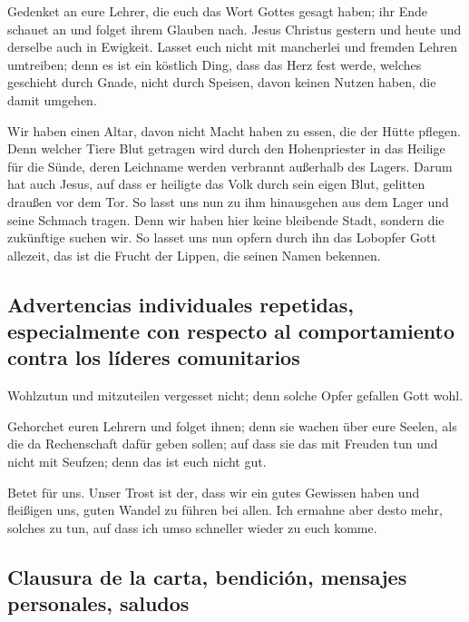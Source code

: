  Gedenket an eure Lehrer, die euch das Wort Gottes gesagt
haben; ihr Ende schauet an und folget ihrem Glauben nach. 
Jesus Christus gestern und heute und derselbe auch in Ewigkeit.
 Lasset euch nicht mit mancherlei und fremden Lehren
umtreiben; denn es ist ein köstlich Ding, dass das Herz fest werde,
welches geschieht durch Gnade, nicht durch Speisen, davon keinen Nutzen
haben, die damit umgehen.

 Wir haben einen Altar, davon nicht Macht haben zu essen,
die der Hütte pflegen.  Denn welcher Tiere Blut getragen
wird durch den Hohenpriester in das Heilige für die Sünde, deren
Leichname werden verbrannt außerhalb des Lagers.  Darum
hat auch Jesus, auf dass er heiligte das Volk durch sein eigen Blut,
gelitten draußen vor dem Tor.  So lasst uns nun zu ihm
hinausgehen aus dem Lager und seine Schmach tragen.  Denn
wir haben hier keine bleibende Stadt, sondern die zukünftige suchen wir.
 So lasset uns nun opfern durch ihn das Lobopfer Gott
allezeit, das ist die Frucht der Lippen, die seinen Namen bekennen.

\hypertarget{advertencias-individuales-repetidas-especialmente-con-respecto-al-comportamiento-contra-los-luxedderes-comunitarios}{%
\subsection{Advertencias individuales repetidas, especialmente con
respecto al comportamiento contra los líderes
comunitarios}\label{advertencias-individuales-repetidas-especialmente-con-respecto-al-comportamiento-contra-los-luxedderes-comunitarios}}

 Wohlzutun und mitzuteilen vergesset nicht; denn solche
Opfer gefallen Gott wohl.

 Gehorchet euren Lehrern und folget ihnen; denn sie
wachen über eure Seelen, als die da Rechenschaft dafür geben sollen; auf
dass sie das mit Freuden tun und nicht mit Seufzen; denn das ist euch
nicht gut.

 Betet für uns. Unser Trost ist der, dass wir ein gutes
Gewissen haben und fleißigen uns, guten Wandel zu führen bei allen.
 Ich ermahne aber desto mehr, solches zu tun, auf dass
ich umso schneller wieder zu euch komme.

\hypertarget{clausura-de-la-carta-bendiciuxf3n-mensajes-personales-saludos}{%
\subsection{Clausura de la carta, bendición, mensajes personales,
saludos}\label{clausura-de-la-carta-bendiciuxf3n-mensajes-personales-saludos}}

